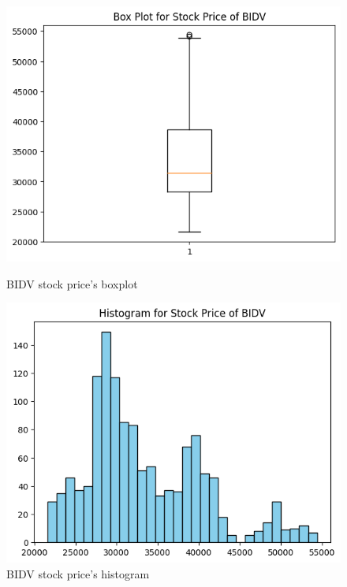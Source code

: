 \begin{figure}[H]
    \centering
    \begin{minipage}{0.23\textwidth}
    \centering
    \includegraphics[width=1\textwidth]{resources/chapter-3/newdata/Boxplot_BIDV.png}
    \caption{BIDV stock price's boxplot}
    \label{fig:bidv_boxplot}
    \end{minipage}
    \hfill
    \begin{minipage}{0.23\textwidth}
    \centering
    \includegraphics[width=1\textwidth]{resources/chapter-3/newdata/Histogram_BIDV.png}
    \caption{BIDV stock price's histogram}
    \label{fig:bidv_histogram}
    \end{minipage}
\end{figure}

